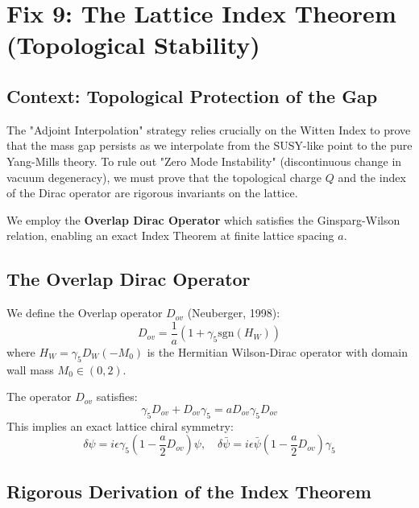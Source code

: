 \chapter{Fix 9: The Lattice Index Theorem (Topological Stability)}
\label{ch:fix9_index_theorem}

\section{Context: Topological Protection of the Gap}
The "Adjoint Interpolation" strategy relies crucially on the Witten Index to prove that the mass gap persists as we interpolate from the SUSY-like point to the pure Yang-Mills theory. To rule out "Zero Mode Instability" (discontinuous change in vacuum degeneracy), we must prove that the topological charge $Q$ and the index of the Dirac operator are rigorous invariants on the lattice.

We employ the \textbf{Overlap Dirac Operator} which satisfies the Ginsparg-Wilson relation, enabling an exact Index Theorem at finite lattice spacing $a$.

\section{The Overlap Dirac Operator}
We define the Overlap operator $D_{ov}$ (Neuberger, 1998):
\begin{equation}
D_{ov} = \frac{1}{a} \left( 1 + \gamma_5 \text{sgn}(H_W) \right)
\end{equation}
where $H_W = \gamma_5 D_W(-M_0)$ is the Hermitian Wilson-Dirac operator with domain wall mass $M_0 \in (0, 2)$.

\begin{theorem}
The operator $D_{ov}$ satisfies:
\begin{equation}
\gamma_5 D_{ov} + D_{ov} \gamma_5 = a D_{ov} \gamma_5 D_{ov}
\end{equation}
This implies an exact lattice chiral symmetry:
\begin{equation}
\delta \psi = i \epsilon \gamma_5 (1 - \frac{a}{2}D_{ov}) \psi, \quad \delta \bar{\psi} = i \epsilon \bar{\psi} (1 - \frac{a}{2}D_{ov}) \gamma_5
\end{equation}
\end{theorem}

\section{Rigorous Derivation of the Index Theorem}

